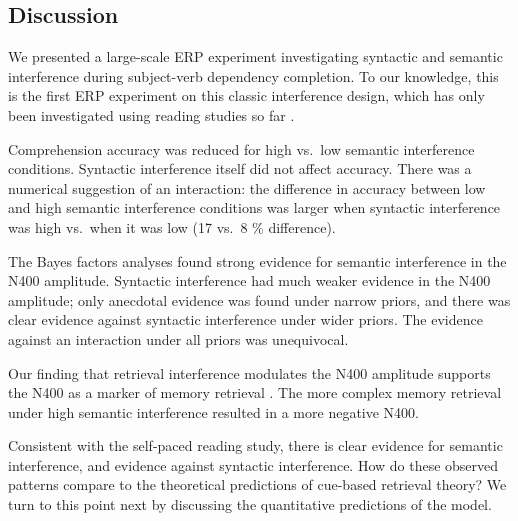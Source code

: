 \documentclass[a4paper, man, floatsintext]{apa7}
\begin{document}
\subsection{Discussion}
We presented a large-scale ERP experiment investigating syntactic and semantic interference during subject-verb dependency completion. To our knowledge, this is the first ERP experiment on this classic interference design, which has only been investigated using reading studies so far \parencite{mertzen,vandyke07}. 

Comprehension accuracy was reduced for high vs.\ low semantic interference conditions. 
Syntactic interference itself did not affect accuracy. There was a numerical suggestion of an interaction: the difference in accuracy between low and high semantic interference conditions was larger when syntactic interference was high vs.\ when it was low (17 vs.\ 8 \% difference). 

The Bayes factors analyses found strong evidence for semantic interference in the N400 amplitude. Syntactic interference had much weaker evidence in the N400 amplitude; only anecdotal evidence was found under narrow priors, and there was clear evidence against syntactic interference under wider priors. The evidence against an interaction under all priors was unequivocal.

Our finding that retrieval interference modulates the N400 amplitude supports the N400 as a marker of memory retrieval \citep{kutas&federmeier_2000, kutas_federmeier2011, brouwer2017_n4_p6, lau2008_n400}. The more complex memory retrieval under high semantic interference resulted in a more negative N400.

Consistent with the self-paced reading study, there is clear evidence for semantic interference, and evidence against syntactic interference.  How do these observed patterns compare to the theoretical predictions of cue-based retrieval theory? We turn to this point next by discussing the quantitative predictions of the \textcite{Lewis2005} model.

\end{document}
